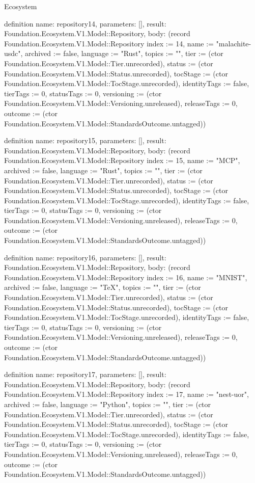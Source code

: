 \begin{lexlean}{Ecosystem}
\begin{semanticmodule}
definition{
  name: repository14,
  parameters: [],
  result: Foundation.Ecosystem.V1.Model::Repository,
  body: (record Foundation.Ecosystem.V1.Model::Repository {index := 14, name := "malachite-usdc", archived := false, language := "Rust", topics := "", tier := (ctor Foundation.Ecosystem.V1.Model::Tier.unrecorded), status := (ctor Foundation.Ecosystem.V1.Model::Status.unrecorded), tocStage := (ctor Foundation.Ecosystem.V1.Model::TocStage.unrecorded), identityTags := false, tierTags := 0, statusTags := 0, versioning := (ctor Foundation.Ecosystem.V1.Model::Versioning.unreleased), releaseTags := 0, outcome := (ctor Foundation.Ecosystem.V1.Model::StandardsOutcome.untagged)})
}

definition{
  name: repository15,
  parameters: [],
  result: Foundation.Ecosystem.V1.Model::Repository,
  body: (record Foundation.Ecosystem.V1.Model::Repository {index := 15, name := "MCP", archived := false, language := "Rust", topics := "", tier := (ctor Foundation.Ecosystem.V1.Model::Tier.unrecorded), status := (ctor Foundation.Ecosystem.V1.Model::Status.unrecorded), tocStage := (ctor Foundation.Ecosystem.V1.Model::TocStage.unrecorded), identityTags := false, tierTags := 0, statusTags := 0, versioning := (ctor Foundation.Ecosystem.V1.Model::Versioning.unreleased), releaseTags := 0, outcome := (ctor Foundation.Ecosystem.V1.Model::StandardsOutcome.untagged)})
}

definition{
  name: repository16,
  parameters: [],
  result: Foundation.Ecosystem.V1.Model::Repository,
  body: (record Foundation.Ecosystem.V1.Model::Repository {index := 16, name := "MNIST", archived := false, language := "TeX", topics := "", tier := (ctor Foundation.Ecosystem.V1.Model::Tier.unrecorded), status := (ctor Foundation.Ecosystem.V1.Model::Status.unrecorded), tocStage := (ctor Foundation.Ecosystem.V1.Model::TocStage.unrecorded), identityTags := false, tierTags := 0, statusTags := 0, versioning := (ctor Foundation.Ecosystem.V1.Model::Versioning.unreleased), releaseTags := 0, outcome := (ctor Foundation.Ecosystem.V1.Model::StandardsOutcome.untagged)})
}

definition{
  name: repository17,
  parameters: [],
  result: Foundation.Ecosystem.V1.Model::Repository,
  body: (record Foundation.Ecosystem.V1.Model::Repository {index := 17, name := "nest-uor", archived := false, language := "Python", topics := "", tier := (ctor Foundation.Ecosystem.V1.Model::Tier.unrecorded), status := (ctor Foundation.Ecosystem.V1.Model::Status.unrecorded), tocStage := (ctor Foundation.Ecosystem.V1.Model::TocStage.unrecorded), identityTags := false, tierTags := 0, statusTags := 0, versioning := (ctor Foundation.Ecosystem.V1.Model::Versioning.unreleased), releaseTags := 0, outcome := (ctor Foundation.Ecosystem.V1.Model::StandardsOutcome.untagged)})
}


\end{semanticmodule}
\end{lexlean}
